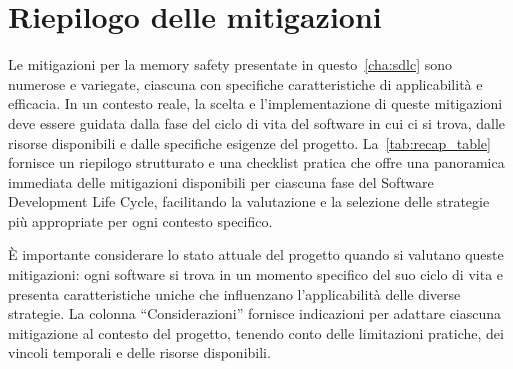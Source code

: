 \section{Riepilogo delle mitigazioni}
\label{sec:recap}

Le mitigazioni per la memory safety presentate in questo~\autoref{cha:sdlc} sono numerose
e variegate, ciascuna con specifiche caratteristiche di applicabilità e
efficacia. In un contesto reale, la scelta e l'implementazione di queste
mitigazioni deve essere guidata dalla fase del ciclo di vita del software in cui
ci si trova, dalle risorse disponibili e dalle specifiche esigenze del progetto.
La~\autoref{tab:recap_table} fornisce un riepilogo strutturato e una checklist
pratica che offre una panoramica immediata delle mitigazioni disponibili per
ciascuna fase del Software Development Life Cycle, facilitando la valutazione e la
selezione delle strategie più appropriate per ogni contesto specifico.

È importante considerare lo stato attuale del progetto quando si valutano queste
mitigazioni: ogni software si trova in un momento specifico del suo ciclo di
vita e presenta caratteristiche uniche che influenzano l'applicabilità delle
diverse strategie. La colonna ``Considerazioni'' fornisce indicazioni per adattare
ciascuna mitigazione al contesto del progetto, tenendo conto delle limitazioni
pratiche, dei vincoli temporali e delle risorse disponibili.

